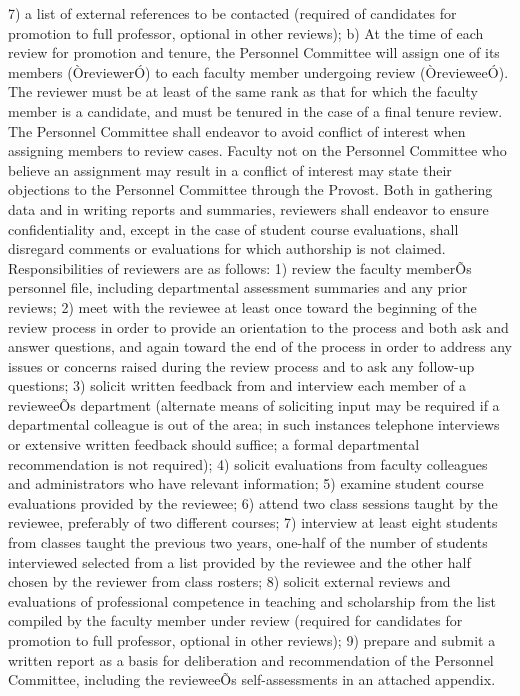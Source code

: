 \documentclass[letterpaper, 11pt]{article}
\begin{document}
7) a list of external references to be contacted (required of candidates for promotion to full professor, optional in other reviews);
b) At the time of each review for promotion and tenure, the Personnel Committee will assign one of its members (ÒreviewerÓ) to each faculty member undergoing review (ÒrevieweeÓ).  The reviewer must be at least of the same rank as that for which the faculty member is a candidate, and must be tenured in the case of a final tenure review.  The Personnel Committee shall endeavor to avoid conflict of interest when assigning members to review cases.  Faculty not on the Personnel Committee who believe an assignment may result in a conflict of interest may state their objections to the Personnel Committee through the Provost.  Both in gathering data and in writing reports and summaries, reviewers shall endeavor to ensure confidentiality and, except in the case of student course evaluations, shall disregard comments or evaluations for which authorship is not claimed.  Responsibilities of reviewers are as follows:
1) review the faculty memberÕs personnel file, including departmental assessment summaries and any prior reviews;
2) meet with the reviewee at least once toward the beginning of the review process in order to provide an orientation to the process and both ask and answer questions, and again toward the end of the process in order to address any issues or concerns raised during the review process and to ask any follow-up questions;
3) solicit written feedback from and interview each member of a revieweeÕs department (alternate means of soliciting input may be required if a departmental colleague is out of the area; in such instances telephone interviews or extensive written feedback should suffice; a formal departmental recommendation is not required);
4) solicit evaluations from faculty colleagues and administrators who have relevant information;
5) examine student course evaluations provided by the reviewee;
6) attend two class sessions taught by the reviewee, preferably of two different courses;
7) interview at least eight students from classes taught the previous two years, one-half of the number of students interviewed selected from a list provided by the reviewee and the other half chosen by the reviewer from class rosters; 
8) solicit external reviews and evaluations of professional competence in teaching and scholarship from the list compiled by the faculty member under review (required for candidates for promotion to full professor, optional in other reviews);
9) prepare and submit a written report as a basis for deliberation and recommendation of the Personnel Committee, including the revieweeÕs self-assessments in an attached appendix.
\end{document}
